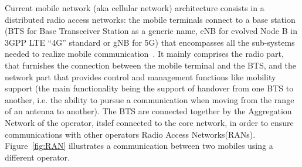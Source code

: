 Current mobile network (aka cellular network) architecture consists in a distributed radio access networks: the mobile terminals connect to a base station (BTS for Base Transceiver Station as a generic name, eNB for evolved Node B in 3GPP LTE “4G” standard or gNB for 5G) that encompasses all the sub-systems needed to realize mobile communication~\cite{bouguen2012lte}. It mainly comprises the radio part, that furnishes the connection between the mobile terminal and the BTS, and the network part that provides control and management functions like mobility support (the main functionality being the support of handover from one BTS to another, i.e. the ability to pursue a communication when moving from the range of an antenna to another).
The BTS are connected together by the Aggregation Network of the operator, itslef connected to the core network, in order to ensure communications with other operators Radio Access Networks(RANs). Figure~\ref{fig:RAN} illustrates a communication between two mobiles using a different operator.

